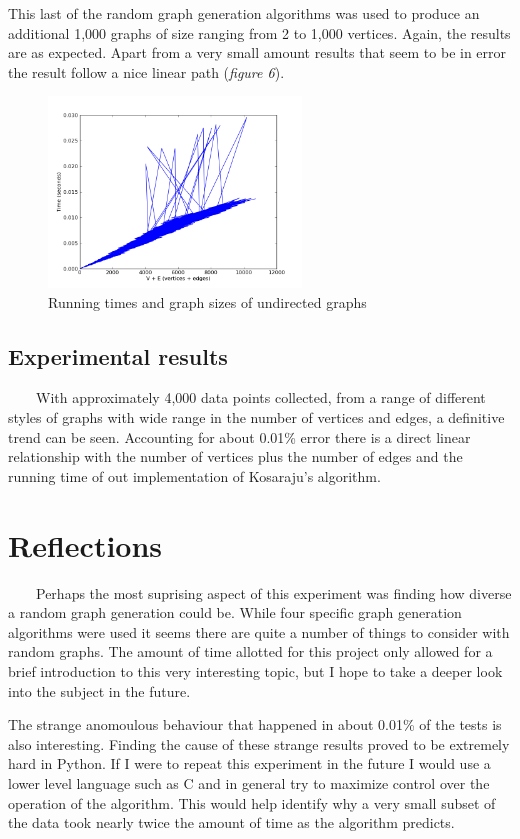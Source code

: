 \documentclass[12pt]{article}
\begin{document}
  This last of the random graph generation algorithms was used to produce an additional 1,000 graphs of size ranging from 2 to 1,000 vertices. Again, the results are as expected. Apart from a very small amount results that seem to be in error the result follow a nice linear path (\emph{figure 6}). 
  
     \begin{figure}[h!]
    \centering
      \includegraphics[width=0.6\textwidth]{undirectedGraph.png}
        \caption{Running times and graph sizes of undirected graphs}
\end{figure} 

  \subsection{Experimental results}
  \ \ \ \ With approximately 4,000 data points collected, from a range of different styles of graphs with wide range in the number of vertices and edges, a definitive trend can be seen. Accounting for about 0.01\% error there is a direct linear relationship with the number of vertices plus the number of edges and the running time of out implementation of Kosaraju's algorithm. 

\section{Reflections}

  \ \ \ \ Perhaps the most suprising aspect of this experiment was finding how diverse a random graph generation could be. While four specific graph generation algorithms were used it seems there are quite a number of things to consider with random graphs. The amount of time allotted for this project only allowed for a brief introduction to this very interesting topic, but I hope to take a deeper look into the subject in the future.
  
  The strange anomoulous behaviour that happened in about 0.01\% of the tests is also interesting. Finding the cause of these strange results proved to be extremely hard in Python. If I were to repeat this experiment in the future I would use a lower level language such as C and in general try to maximize control over the operation of the algorithm. This would help identify why a very small subset of the data took nearly twice the amount of time as the algorithm predicts.
  
\end{document}
